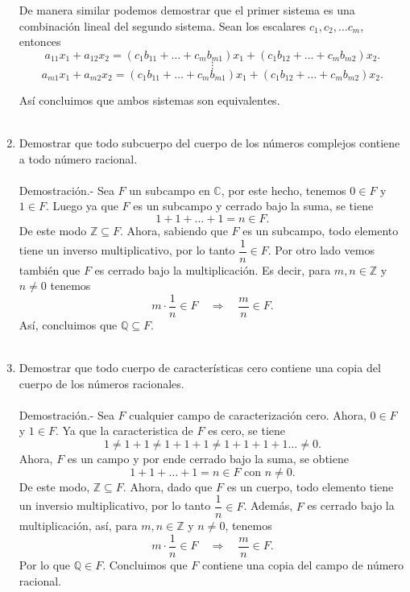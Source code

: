 \begin{enumerate}[\bfseries 1.]
	De manera similar podemos demostrar que el primer sistema es una combinación lineal del segundo sistema. Sean los escalares $c_1,c_2,\ldots c_m$, entonces
	$$a_{11}x_1+a_{12}x_2=\left(c_1b_{11}+\ldots + c_m b_{m1}\right)x_1 + \left(c_1 b_{12}+\ldots + c_m b_{m2}\right)x_2.$$
	$$\vdots$$
	$$a_{m1}x_1+a_{m2}x_2=\left(c_1b_{11}+\ldots + c_m b_{m1}\right)x_1 + \left(c_1 b_{12}+\ldots + c_m b_{m2}\right)x_2.$$

	Así concluimos que ambos sistemas son equivalentes.\\\\


    \item Demostrar que todo subcuerpo del cuerpo de los números complejos contiene a todo número racional.\\\\
	Demostración.-\; Sea $F$ un subcampo en $\mathbb{C}$, por este hecho,  tenemos $0\in F$ y $1\in F$. Luego ya que $F$ es un subcampo y cerrado bajo la suma, se tiene
	$$1+1+\ldots + 1 = n\in F.$$
	De este modo $\mathbb{Z}\subseteq F$. Ahora, sabiendo que $F$ es un subcampo, todo elemento tiene un inverso multiplicativo, por lo tanto $\dfrac{1}{n}\in F$. Por otro lado vemos también que $F$ es cerrado bajo la multiplicación. Es decir, para $m,n\in \mathbb{Z}$ y $n\neq 0$ tenemos
	$$m\cdot \dfrac{1}{n}\in F\quad \Rightarrow \quad \dfrac{m}{n}\in F.$$
	Así, concluimos que $\mathbb{Q}\subseteq F.$\\\\

    \item Demostrar que todo cuerpo de características cero contiene una copia del cuerpo de los números racionales.\\\\
	Demostración.-\; Sea $F$ cualquier campo de caracterización cero. Ahora, $0\in F$ y $1\in F$. Ya que la caracteristica de $F$ es cero, se tiene
	$$1\neq 1+1\neq 1+1+1\neq1+1+1+1\ldots \neq 0.$$
	Ahora, $F$ es un campo y por ende cerrado bajo la suma, se obtiene
	$$1+1+\ldots + 1 = n\in F \mbox{ con } n\neq 0.$$
	De este modo, $\mathbb{Z}\subseteq F$. Ahora, dado que $F$ es un cuerpo, todo elemento tiene un inversio multiplicativo, por lo tanto $\dfrac{1}{n}\in F$. Además, $F$ es cerrado bajo la multiplicación, así, para $m, n \in \mathbb{Z}$ y $n \neq 0$, tenemos
	$$m\cdot \dfrac{1}{n}\in F\quad \Rightarrow \quad \dfrac{m}{n}\in F.$$
	Por lo que $\mathbb{Q}\in F$. Concluimos que $F$ contiene una copia del campo de número racional.\\\\

\end{enumerate}


